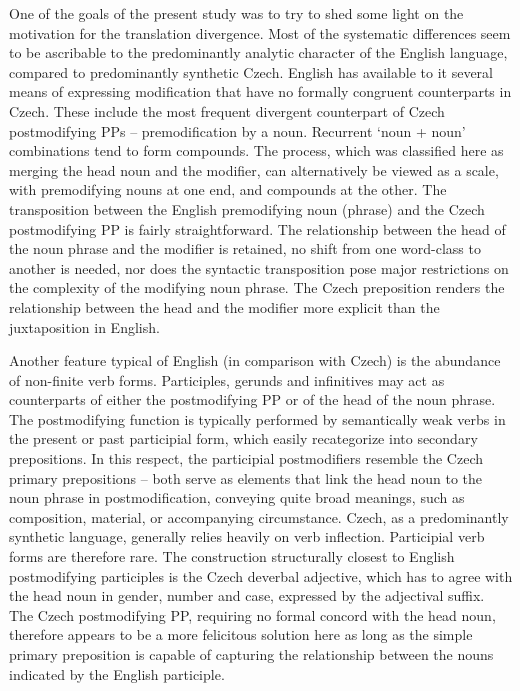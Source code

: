 \documentclass[output=paper]{langscibook}
\begin{document}
One of the goals of the present study was to try to shed some light on the motivation for the translation divergence. Most of the systematic differences seem to be ascribable to the predominantly analytic character of the English language, compared to predominantly synthetic Czech. English has available to it several means of expressing modification that have no formally congruent counterparts in Czech. These include the most frequent divergent counterpart of Czech postmodifying PPs – premodification by a noun. Recurrent ‘noun + noun’ combinations tend to form compounds. The process, which was classified here as merging the head noun and the modifier, can alternatively be viewed as a scale, with premodifying nouns at one end, and compounds at the other. The transposition between the English premodifying noun (phrase) and the Czech postmodifying PP is fairly straightforward. The relationship between the head of the noun phrase and the modifier is retained, no shift from one word-class to another is needed, nor does the syntactic transposition pose major restrictions on the complexity of the modifying noun phrase. The Czech preposition renders the relationship between the head and the modifier more explicit than the juxtaposition in English.

Another feature typical of English (in comparison with Czech) is the abundance of non-finite verb forms. Participles, gerunds and infinitives may act as counterparts of either the postmodifying PP or of the head of the noun phrase. The postmodifying function is typically performed by semantically weak verbs in the present or past participial form, which easily recategorize into secondary prepositions. In this respect, the participial postmodifiers resemble the Czech primary prepositions – both serve as elements that link the head noun to the noun phrase in postmodification, conveying quite broad meanings, such as composition, material, or accompanying circumstance. Czech, as a predominantly synthetic language, generally relies heavily on verb inflection. Participial verb forms are therefore rare. The construction structurally closest to English postmodifying participles is the Czech deverbal adjective, which has to agree with the head noun in gender, number and case, expressed by the adjectival suffix. The Czech postmodifying PP, requiring no formal concord with the head noun, therefore appears to be a more felicitous solution here as long as the simple primary preposition is capable of capturing the relationship between the nouns indicated by the English participle.
\end{document}
